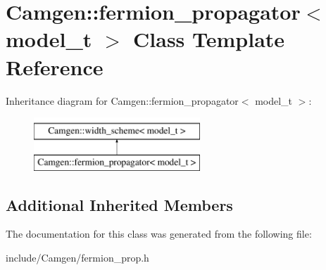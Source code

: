 \hypertarget{a00223}{}\section{Camgen\+:\+:fermion\+\_\+propagator$<$ model\+\_\+t $>$ Class Template Reference}
\label{a00223}
Inheritance diagram for Camgen\+:\+:fermion\+\_\+propagator$<$ model\+\_\+t $>$\+:\begin{figure}[H]
\begin{center}
\leavevmode
\includegraphics[height=2.000000cm]{a00223}
\end{center}
\end{figure}
\subsection*{Additional Inherited Members}


The documentation for this class was generated from the following file\+:\begin{DoxyCompactItemize}
\item 
include/\+Camgen/fermion\+\_\+prop.\+h\end{DoxyCompactItemize}
